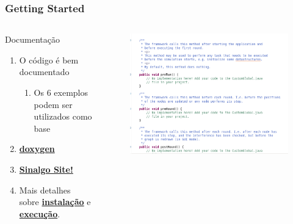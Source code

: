\documentclass{beamer}
\begin{document}

\begin{frame}
\frametitle{Getting Started}


\begin{columns}[c] %

\begin{block}{Documentação}
	\begin{enumerate}
		\item O código é bem documentado
		\begin{enumerate}
			\item Os 6 exemplos podem ser utilizados como base
		\end{enumerate}

		\item \href{http://www.stack.nl/~dimitri/doxygen/}{\textbf{doxygen}}
		
		\item \href{http://disco.ethz.ch/projects/sinalgo/index.html}{\textbf{Sinalgo Site!}}
		
		\item Mais detalhes sobre  \href{http://disco.ethz.ch/projects/sinalgo/tutorial/Installation.html}{\textbf{instalação}} 
		e 
\href{http://disco.ethz.ch/projects/sinalgo/tutorial/Execution.html}{\textbf{execução}}.
	\end{enumerate}
\end{block}


\begin{exampleblock}{}
\begin{figure}[t]
	\includegraphics[width=1\linewidth]{img/documentation}
\end{figure}
\end{exampleblock}

\end{columns}

\end{frame}
\end{document}
